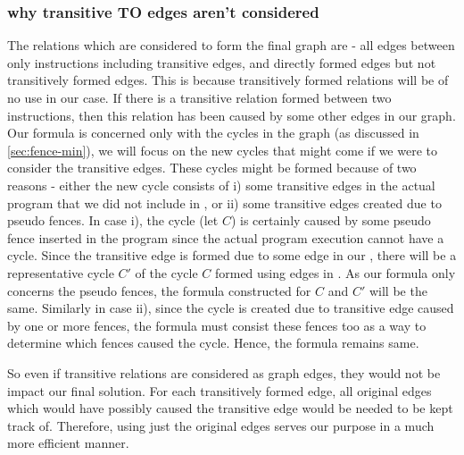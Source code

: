 \subsubsection{why transitive TO edges aren't considered} \label{sec:no-transitive}
The relations which are considered to form the final graph are - 
all \setSB edges between only \mosc instructions including transitive \setSB edges, 
and directly formed \setTO edges but not transitively formed \setTO edges.  
This is because transitively formed \setTO relations will be of 
no use in our case. If there is a transitive \setTO relation formed 
between two instructions, then this relation has been caused by 
some other edges in our graph. 
Our formula is concerned only with the cycles in the graph 
(as discussed in \textsection\ref{sec:fence-min}), we will focus on 
the new cycles that might come if we were to consider the transitive 
edges. These cycles might be formed because of two reasons - 
either the new cycle consists of i) some transitive edges in the 
actual program that we did not include in \setTO, or ii) some 
transitive edges created due to pseudo fences. In case i), the cycle 
(let $C$) is certainly caused by some pseudo fence inserted in the program 
since the actual program execution cannot have a cycle. Since the 
transitive edge is formed due to some edge in our \setTO, there 
will be a representative cycle $C'$ of the cycle $C$ formed using 
edges in \setTO. As our formula only concerns the pseudo fences, 
the formula constructed for $C$ and $C'$ will be the same. 
Similarly in case ii), since the cycle is created due to transitive 
edge caused by one or more fences, the formula must consist these 
fences too as a way to determine which fences caused the cycle. Hence,
the formula remains same. 




\par
So even if transitive \setTO relations are considered as graph edges, 
they would not be impact our final solution. For each transitively 
formed edge, all original edges which would have possibly caused 
the transitive edge would be needed to be kept track of. 
Therefore, using just the original edges serves our purpose 
in a much more efficient manner.